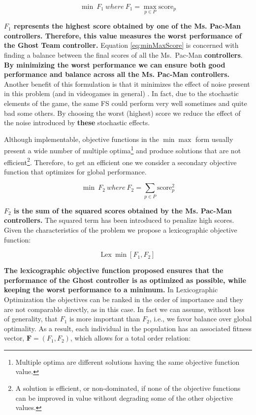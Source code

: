 \documentclass[journal]{IEEEtran}
\begin{document}
\begin{equation}
\label{eq:minMaxScore}
	\min \: F_1 \: where \: F_1 = \max_{p \in P} \text{score}_p
\end{equation}

\textbf{$F_1$ represents the highest score obtained by one of the Ms. Pac-Man controllers. Therefore, this value measures the worst performance of the Ghost Team controller.} Equation \eqref{eq:minMaxScore} is concerned with finding a balance between the final scores of all the Ms.\  Pac-Man \textbf{controllers}. \textbf{By minimizing the worst performance we can ensure both good performance and balance across all the Ms. Pac-Man controllers.} Another benefit of this formulation is that it minimizes the effect of noise present in this problem (and in videogames in general) \cite{Mora12}. In fact, due to the stochastic elements of the game, the same FS could perform very well sometimes and quite bad some others. By choosing the worst (highest) score we reduce the effect of the noise introduced by \textbf{these} stochastic effects.

Although implementable, objective functions in the $\min \max$ form usually present a wide number of multiple optima\footnote{Multiple optima are different solutions having the same objective function value.} and produce solutions that are not efficient\footnote{A solution is efficient, or non-dominated, if none of the objective functions can be improved in value without degrading some of the other objective values.}. Therefore, to get an efficient one we consider a secondary objective function that optimizes for global performance.

\begin{equation}
\label{eq:minSquareScore}
	\min \: F_2 \: where \: F_2 = \sum_{p \in P} \text{score}_p^2
\end{equation}

\textbf{$F_2$ is the sum of the squared scores obtained by the Ms. Pac-Man controllers.} The squared term has been introduced to penalize high scores. Given the characteristics of the problem we propose a lexicographic objective function:

\begin{equation}
\label{eq:lexicographic}
	\text{Lex} \: \min [F_1,F_2]
\end{equation}

\textbf{The lexicographic objective function proposed ensures that the performance of the Ghost controller is as optimized as possible, while keeping the worst performance to a minimum.} In Lexicographic Optimization \cite{Dylan2010} the objectives can be ranked in the order of importance and they are not comparable directly, as in this case. In fact we can assume, without loss of generality, that $F_1$ is more important than $F_2$, i.e., we favor balance over global optimality. As a result, each individual in the population has an associated fitness vector, $\mathbf{F}=(F_1,F_2)$, which allows for a total order relation:
\end{document}
